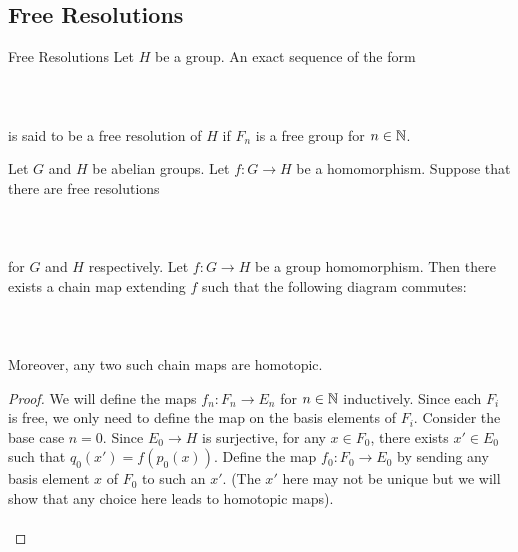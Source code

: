 \documentclass[a4paper]{article}
\begin{document}
\subsection{Free Resolutions}
\begin{defn}{Free Resolutions}{} Let $H$ be a group. An exact sequence of the form \\~\\
\\~\\
is said to be a free resolution of $H$ if $F_n$ is a free group for $n\in\mathbb{N}$. 
\end{defn}

\begin{prp}{}{} Let $G$ and $H$ be abelian groups. Let $f:G\to H$ be a homomorphism. Suppose that there are free resolutions \\~\\
\\~\\
for $G$ and $H$ respectively. Let $f:G\to H$ be a group homomorphism. Then there exists a chain map extending $f$ such that the following diagram commutes: \\~\\
\\~\\
Moreover, any two such chain maps are homotopic. \tcbline
\begin{proof}
We will define the maps $f_n:F_n\to E_n$ for $n\in\mathbb{N}$ inductively. Since each $F_i$ is free, we only need to define the map on the basis elements of $F_i$. Consider the base case $n=0$. Since $E_0\to H$ is surjective, for any $x\in F_0$, there exists $x'\in E_0$ such that $q_0(x')=f(p_0(x))$. Define the map $f_0:F_0\to E_0$ by sending any basis element $x$ of $F_0$ to such an $x'$. (The $x'$ here may not be unique but we will show that any choice here leads to homotopic maps). \\~\\


\end{proof}
\end{prp}
\end{document}
